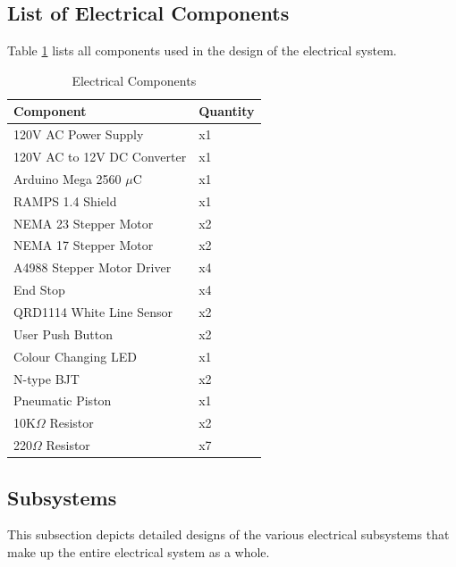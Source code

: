\documentclass[titlepage]{article}
\begin{document}
\subsection{List of Electrical Components}
Table \ref{tab:ElectricalComponents} lists all components used in the design of the electrical system.
\begin{table}[h!]
\centering
\caption{Electrical Components}
\begin{tabular}{| p{6cm} | p{6cm} |}\hline
	\textbf{Component}	&\textbf{\centering Quantity}\\\hline
	120V AC Power Supply					&x1\\\hline
	120V AC to 12V DC Converter				&x1\\\hline
	Arduino Mega 2560 $\mu$C				&x1\\\hline
	RAMPS 1.4 Shield						&x1\\\hline
	NEMA 23 Stepper Motor					&x2\\\hline
	NEMA 17 Stepper Motor					&x2\\\hline
	A4988 Stepper Motor Driver				&x4\\\hline
	End Stop							&x4\\\hline
	QRD1114 White Line Sensor				&x2\\\hline
	User Push Button						&x2\\\hline
	Colour Changing LED					&x1\\\hline
	N-type BJT							&x2\\\hline
	Pneumatic Piston						&x1\\\hline
	10K$\Omega$ Resistor					&x2\\\hline
	220$\Omega$ Resistor					&x7\\\hline

\end{tabular}
\label{tab:ElectricalComponents}
\end{table}

\newpage
\subsection{Subsystems}
This subsection depicts detailed designs of the various electrical subsystems that make up the entire electrical system as a whole.
\end{document}
